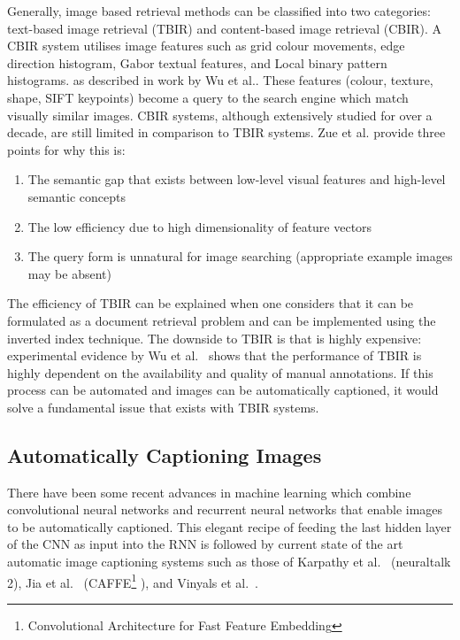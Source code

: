 Generally, image based retrieval methods can be classified into two categories: text-based image retrieval (TBIR) and content-based image retrieval (CBIR). A CBIR system utilises image features such as grid colour movements, edge direction histogram, Gabor textual features, and Local binary pattern histograms. as described in work by Wu et al.\cite{wu2009distance}. These features (colour, texture, shape, SIFT keypoints) become a query to the search engine which match visually similar images. CBIR systems, although extensively studied for over a decade, are still limited in comparison to TBIR systems. Zue et al.\cite{zhu2010image} provide three points for why this is:
\begin{enumerate}
    \item The semantic gap that exists between low-level visual features and high-level semantic concepts
    \item The low efficiency due to high dimensionality of feature vectors
    \item The query form is unnatural for image searching (appropriate example images may be absent)
\end{enumerate}
The efficiency of TBIR can be explained when one considers that it can be formulated as a document retrieval problem and can be implemented using the inverted index technique. The downside to TBIR is that is highly expensive: experimental evidence by Wu et al.~\cite{wu2013tag} shows that the performance of TBIR is highly dependent on the availability and quality of manual annotations. If this process can be automated and images can be automatically captioned, it would solve a fundamental issue that exists with TBIR systems.

\subsection{Automatically Captioning Images}

There have been some recent advances in machine learning which combine convolutional neural networks and recurrent neural networks that enable images to be automatically captioned. This elegant recipe of feeding the last hidden layer of the CNN as input into the RNN is followed by current state of the art automatic image captioning systems such as those of Karpathy et al.~\cite{karpathy2015deep} (neuraltalk 2), Jia et al.~\cite{jia2014caffe} (CAFFE\footnote{Convolutional Architecture for Fast Feature Embedding} ), and Vinyals et al.~\cite{arXiv2016160906647V}.

